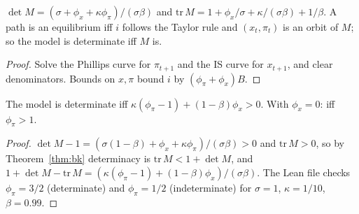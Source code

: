 \begin{lemma}
\label{lem:nk_forward}
\leanok
{}
$\det M = (\sigma + \phi_x + \kappa\phi_\pi)/(\sigma\beta)$ and $\mathrm{tr}\,M = 1 + \phi_x/\sigma + \kappa/(\sigma\beta) + 1/\beta$.
A path is an equilibrium iff $i$ follows the Taylor rule and $(x_t, \pi_t)$ is an orbit of $M$; so the model is
determinate iff $M$ is.
\end{lemma}
\begin{proof}
\leanok
Solve the Phillips curve for $\pi_{t+1}$ and the IS curve for $x_{t+1}$, and clear denominators. Bounds on $x, \pi$
bound $i$ by $(\phi_\pi + \phi_x)B$.
\end{proof}

\begin{theorem}
\label{thm:nk_taylor}
\leanok
{}
The model is determinate iff $\kappa(\phi_\pi - 1) + (1-\beta)\phi_x > 0$. With $\phi_x = 0$: iff $\phi_\pi > 1$.
\end{theorem}
\begin{proof}
\leanok
$\det M - 1 = (\sigma(1-\beta) + \phi_x + \kappa\phi_\pi)/(\sigma\beta) > 0$ and $\mathrm{tr}\,M > 0$, so by
Theorem~\ref{thm:bk} determinacy is $\mathrm{tr}\,M < 1 + \det M$, and
$1 + \det M - \mathrm{tr}\,M = (\kappa(\phi_\pi - 1) + (1-\beta)\phi_x)/(\sigma\beta)$. The Lean file checks
$\phi_\pi = 3/2$ (determinate) and $\phi_\pi = 1/2$ (indeterminate) for $\sigma = 1$, $\kappa = 1/10$, $\beta = 0.99$.
\end{proof}
